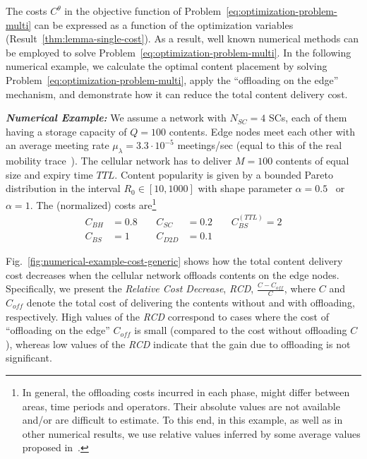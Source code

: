 \documentclass[10pt,conference,letterpaper]{IEEEtran}
\begin{document}
The costs $C^{\theta}$ in the objective function of Problem~\ref{eq:optimization-problem-multi} can be expressed as a function of the optimization variables (Result~\ref{thm:lemma-single-cost}). As a result, well known numerical methods can be employed to solve Problem~\ref{eq:optimization-problem-multi}. In the following numerical example, we calculate the optimal content placement by solving Problem~\ref{eq:optimization-problem-multi}, apply the ``offloading on the edge'' mechanism, and demonstrate how it can reduce the total content delivery cost.

\textbf{\textit{Numerical Example:}} We assume a network with $N_{SC}=4$ SCs, each of them having a storage capacity of $Q=100$ contents. Edge nodes meet each other with an average meeting rate $\mu_{\lambda} = 3.3\cdot 10^{-5}$ meetings/sec (equal to this of the real mobility trace~\cite{infocom-trace}). The cellular network has to deliver $M=100$ contents of equal size and expiry time $TTL$. Content popularity is given by a bounded Pareto distribution in the interval $R_{0}\in[10, 1000]$ with shape parameter $\alpha = 0.5$~\cite{youtube-traffic-from-edge} or $\alpha=1$. The (normalized) costs are\footnote{In general, the offloading costs incurred in each phase, might differ between areas, time periods and operators. Their absolute values are not available and/or are difficult to estimate. To this end, in this example, as well as in other numerical results, we use relative values inferred by some average values proposed in~\cite{johansson2007cost}.} 
\begin{align*}
 C_{BH} &= 0.8~~~~~&C_{SC}&=0.2~~~~~&C_{BS}^{(TTL)}=2\\
 C_{BS}&=1 ~~~~~&C_{D2D}&=0.1~~~~~&
\end{align*}

Fig.~\ref{fig:numerical-example-cost-generic} shows how the total content delivery cost decreases when the cellular network offloads contents on the edge nodes. Specifically, we present the \textit{Relative Cost Decrease}, \textit{RCD}, $\frac{C-C_{off}}{C}$, where $C$ and $C_{off}$ denote the total cost of delivering the contents without and with offloading, respectively. High values of the \textit{RCD} correspond to cases where the cost of ``offloading on the edge'' $C_{off}$ is small (compared to the cost without offloading $C$), whereas low values of the \textit{RCD} indicate that the gain due to offloading is not significant.
\end{document}
